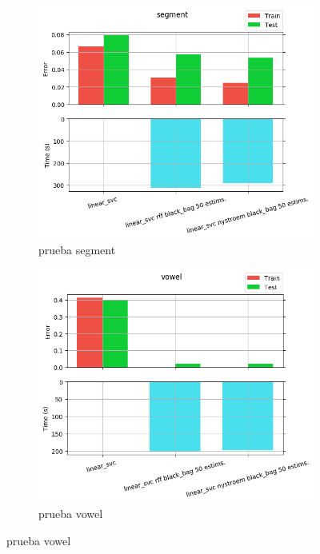 \begin{figure}[ht]
  \centering
  \begin{subfigure}[b]{0.5\linewidth}
    \centering\captionsetup{width=.8\linewidth}\includegraphics[width=\imgscale\linewidth]{Figures/2_6/segment}
    \caption{prueba segment}
    \label{fig:2_6_segment}
  \end{subfigure}%
  \begin{subfigure}[b]{0.5\linewidth}
    \centering\captionsetup{width=.8\linewidth}\includegraphics[width=\imgscale\linewidth]{Figures/2_6/vowel}
    \caption{prueba vowel}
    \label{fig:2_6_vowel}
  \end{subfigure}
\end{figure}
